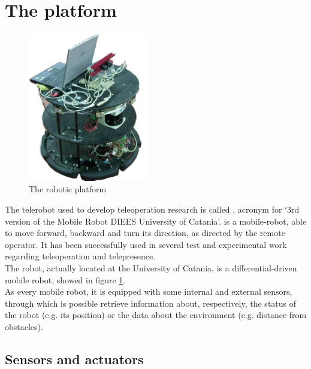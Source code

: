 \section{The \morduc{} platform}
\label{intro:3morduc}

\begin{figure} [h]
  \begin{center}
    \includegraphics[width=150pt]{img/3morduc.jpg}
    \caption{The \morduc{} robotic platform}
    \label{fig:morduc}
  \end{center}
\end{figure}

The telerobot used to develop teleoperation research is
called \morduc{}, acronym for `3rd version of
the Mobile Robot DIEES University of Catania'.
\morduc{} is a mobile-robot, able to move forward, backward
and turn its direction, as directed by the remote operator.
It has been successfully used in several test and experimental
work regarding teleoperation and telepresence.
\\
The robot, actually located at the University of
Catania, is a differential-driven mobile robot, showed
in figure \ref{fig:morduc}.
\\
As every mobile robot, it is equipped with some internal
and external sensors, through which is possible retrieve
information about, respectively, the status of the robot
(e.g. its position) or the data about the environment (e.g.
distance from obstacles).

\subsection{Sensors and actuators}
\label{intro:3morduc:sensors_actuators}


